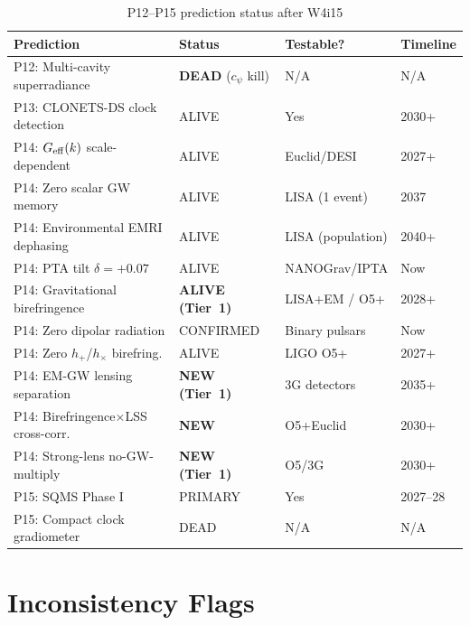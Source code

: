 \documentclass[11pt]{article}
\newcommand{\Geff}{G_{\rm eff}}
\begin{document}
\begin{table}[H]
\centering
\caption{P12--P15 prediction status after W4i15}
\begin{tabular}{llll}
\toprule
Prediction & Status & Testable? & Timeline \\
\midrule
P12: Multi-cavity superradiance & \textbf{DEAD} ($c_\psi$ kill) & N/A & N/A \\
P13: CLONETS-DS clock detection & ALIVE & Yes & 2030+ \\
P14: $\Geff(k)$ scale-dependent & ALIVE & Euclid/DESI & 2027+ \\
P14: Zero scalar GW memory & ALIVE & LISA (1 event) & 2037 \\
P14: Environmental EMRI dephasing & ALIVE & LISA (population) & 2040+ \\
P14: PTA tilt $\delta = +0.07$ & ALIVE & NANOGrav/IPTA & Now \\
P14: Gravitational birefringence & \textbf{ALIVE (Tier~1)} & LISA+EM / O5+ & 2028+ \\
P14: Zero dipolar radiation & CONFIRMED & Binary pulsars & Now \\
P14: Zero $h_+$/$h_\times$ birefring. & ALIVE & LIGO O5+ & 2027+ \\
P14: EM-GW lensing separation & \textbf{NEW (Tier~1)} & 3G detectors & 2035+ \\
P14: Birefringence$\times$LSS cross-corr. & \textbf{NEW} & O5+Euclid & 2030+ \\
P14: Strong-lens no-GW-multiply & \textbf{NEW (Tier~1)} & O5/3G & 2030+ \\
P15: SQMS Phase I & PRIMARY & Yes & 2027--28 \\
P15: Compact clock gradiometer & DEAD & N/A & N/A \\
\bottomrule
\end{tabular}
\end{table}

\section{Inconsistency Flags}
\end{document}
